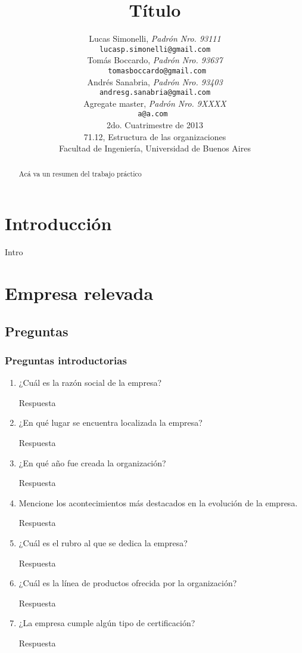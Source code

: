 \documentclass[a4paper,10pt]{article}
\title{		\textbf{Título}}
\author{	Lucas Simonelli, \textit{Padrón Nro. 93111}                     \\
            \texttt{ lucasp.simonelli@gmail.com }                                              \\[2.5ex]
            Tomás Boccardo, \textit{Padrón Nro. 93637}                     \\
            \texttt{ tomasboccardo@gmail.com}                                              \\[2.5ex]
            Andrés Sanabria, \textit{Padrón Nro. 93403}                     \\
            \texttt{ andresg.sanabria@gmail.com  }                                              \\[2.5ex]
             Agregate master, \textit{Padrón Nro. 9XXXX}                     \\
            \texttt{a@a.com  }                                              \\[2.5ex]
            \normalsize{2do. Cuatrimestre de 2013}                                      \\
            \normalsize{71.12, Estructura de las organizaciones}  \\
            \normalsize{Facultad de Ingeniería, Universidad de Buenos Aires}            \\
       }
\date{}
\begin{document}
\maketitle
\thispagestyle{empty}   %



\begin{abstract}
Acá va un resumen del trabajo práctico
\end{abstract}

\newpage
\tableofcontents
\newpage
\section{Introducción}
Intro
\section{Empresa relevada}
	\subsection{Preguntas}
		\subsubsection{Preguntas introductorias}
			\begin{enumerate}
				\item ¿Cuál es la razón social de la empresa?
				
				Respuesta
				
				\item ¿En qué lugar se encuentra localizada la empresa?
				
				Respuesta
				
				\item ¿En qué año fue creada la organización?
				
				Respuesta
				
				\item Mencione los acontecimientos más destacados en la evolución de la empresa.
				
				Respuesta
				
				\item ¿Cuál es el rubro al que se dedica la empresa?
				
				Respuesta
				
				\item ¿Cuál es la línea de productos ofrecida por la organización?
				
				Respuesta
				
				\item ¿La empresa cumple algún tipo de certificación?	
				
				Respuesta
				
			
			\end{enumerate}
			
\end{document}
